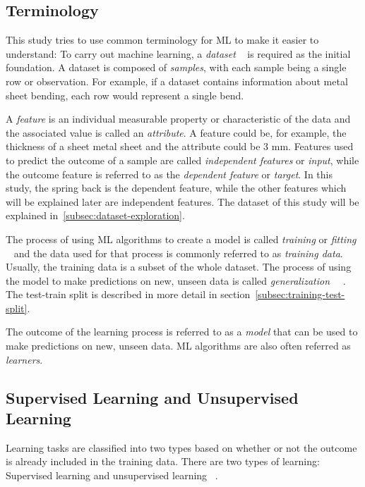 \subsection{Terminology}\label{subsec:terminology}
This study tries to use common terminology for \ac{ML} to make it easier to understand:
To carry out machine learning, a \textit{dataset} ~\cite[p. 3]{zhou2021machine} is required as the
initial foundation.
A dataset is composed of \textit{samples}, with each sample being a single row or observation.
For example, if a dataset contains information about metal sheet bending, each row would represent a single bend.

A \textit{feature} is an individual measurable property or characteristic of the data and the associated value is
called an \textit{attribute}.
A feature could be, for example, the thickness of a sheet metal sheet and the attribute could be 3 mm.
Features used to predict the outcome of a sample are called \textit{independent features} or \textit{input}, while the
outcome feature is referred to as the \textit{dependent feature} or \textit{target}.
In this study, the spring back is the dependent feature, while the other features which will be explained later are
independent features.
The dataset of this study will be explained in~\cref{subsec:dataset-exploration}.

The process of using \ac{ML} algorithms to create a model is called \textit{training} or \textit{fitting}
~\cite[p. 4]{el2015machine} and the data used for that process is commonly referred to as \textit{training data}.
Usually, the training data is a subset of the whole dataset.
The process of using the model to make predictions on new, unseen data is called
\textit{generalization}
~\cite[pp. 26--27]{muller2016introduction}~\cite[p. 4]{zhou2021machine}.
The test-train split is described in more detail in section~\ref{subsec:training-test-split}.

The outcome of the learning process is referred to as a \textit{model} that can be used to make predictions on new,
unseen data. \ac{ML} algorithms are also often referred as \textit{learners}.

\subsection{Supervised Learning and Unsupervised Learning}\label{subsec:supervised-learning}
Learning tasks are classified into two types based on whether or not the outcome is already included in the training
data.
There are two types of learning: Supervised learning and unsupervised learning
~\cite[p. 4]{zhou2021machine}.

